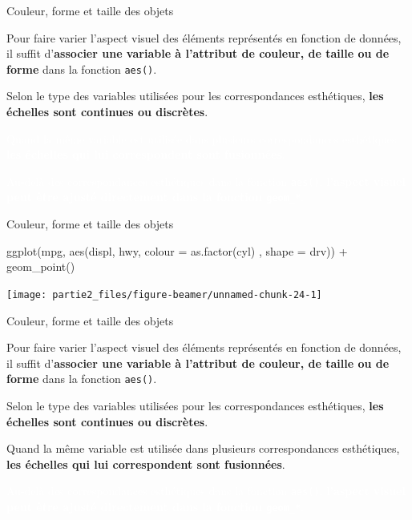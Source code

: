 \documentclass[12pt,ignorenonframetext,]{beamer}
\newenvironment{Shaded}{}{}
\newcommand{\DataTypeTok}[1]{#1}
\newcommand{\KeywordTok}[1]{\textcolor[rgb]{0.00,0.00,1.00}{#1}}
\newcommand{\NormalTok}[1]{#1}
\newcommand{\OperatorTok}[1]{#1}
\newcommand{\StringTok}[1]{\textcolor[rgb]{0.00,0.50,0.50}{#1}}
\renewenvironment{Shaded}{\begin{snugshade}}{\end{snugshade}}
\begin{document}
\begin{frame}{Couleur, forme et taille des objets}
\protect\hypertarget{couleur-forme-et-taille-des-objets-5}{}

Pour faire varier l’aspect visuel des éléments représentés en fonction
de données, il suffit
d’\textbf{associer une variable à l'attribut de couleur, de taille ou de forme}
dans la fonction \texttt{aes()}.

Selon le type des variables utilisées pour les correspondances
esthétiques, \textbf{les échelles sont continues ou discrètes}.

\textcolor{white}{Quand la même variable est utilisée dans plusieurs correspondances esthétiques, \textbf{les échelles qui lui correspondent sont fusionnées}.}

\textcolor{white}{Au-delà des correspondances esthétiques dans la fonction \texttt{aes()}, \textbf{l'aspect visuel peut être ajusté directement dans la fonction \texttt{geom\_*}}.}

\end{frame}

\begin{frame}[fragile]{Couleur, forme et taille des objets}
\protect\hypertarget{couleur-forme-et-taille-des-objets-6}{}

\footnotesize \center

\begin{Shaded}
\begin{Highlighting}[]
\KeywordTok{ggplot}\NormalTok{(mpg, }\KeywordTok{aes}\NormalTok{(displ, hwy, }\DataTypeTok{colour =} \KeywordTok{as.factor}\NormalTok{(cyl)}
\NormalTok{  , }\DataTypeTok{shape =}\NormalTok{ drv)) }\OperatorTok{+}
\StringTok{  }\KeywordTok{geom_point}\NormalTok{()}
\end{Highlighting}
\end{Shaded}

\texttt{[image: partie2\_files/figure-beamer/unnamed-chunk-24-1]}

\end{frame}

\begin{frame}{Couleur, forme et taille des objets}
\protect\hypertarget{couleur-forme-et-taille-des-objets-7}{}

Pour faire varier l’aspect visuel des éléments représentés en fonction
de données, il suffit
d’\textbf{associer une variable à l'attribut de couleur, de taille ou de forme}
dans la fonction \texttt{aes()}.

Selon le type des variables utilisées pour les correspondances
esthétiques, \textbf{les échelles sont continues ou discrètes}.

Quand la même variable est utilisée dans plusieurs correspondances
esthétiques,
\textbf{les échelles qui lui correspondent sont fusionnées}.

\textcolor{white}{Au-delà des correspondances esthétiques dans la fonction \texttt{aes()}, \textbf{l'aspect visuel peut être ajusté directement dans la fonction \texttt{geom\_*}}.}

\end{frame}
\end{document}
